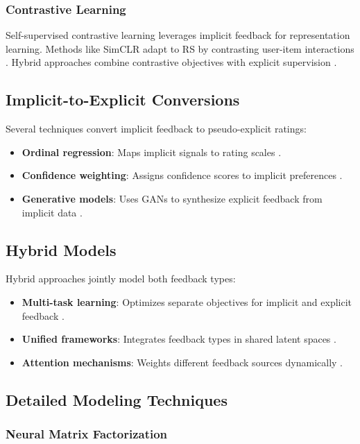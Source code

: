 \subsubsection{Contrastive Learning}
Self-supervised contrastive learning leverages implicit feedback for representation learning. Methods like SimCLR adapt to RS by contrasting user-item interactions \cite{wu2021self}. Hybrid approaches combine contrastive objectives with explicit supervision \cite{xie2022contrastive}.

\subsection{Implicit-to-Explicit Conversions}

Several techniques convert implicit feedback to pseudo-explicit ratings:
\begin{itemize}
    \item \textbf{Ordinal regression}: Maps implicit signals to rating scales \cite{weston2011wsabie}.
    \item \textbf{Confidence weighting}: Assigns confidence scores to implicit preferences \cite{he2016fast}.
    \item \textbf{Generative models}: Uses GANs to synthesize explicit feedback from implicit data \cite{wang2017irgan}.
\end{itemize}

\subsection{Hybrid Models}

Hybrid approaches jointly model both feedback types:
\begin{itemize}
    \item \textbf{Multi-task learning}: Optimizes separate objectives for implicit and explicit feedback \cite{ma2011learning}.
    \item \textbf{Unified frameworks}: Integrates feedback types in shared latent spaces \cite{lian2017cccfnet}.
    \item \textbf{Attention mechanisms}: Weights different feedback sources dynamically \cite{chen2017attentive}.
\end{itemize}

\subsection{Detailed Modeling Techniques}

\subsubsection{Neural Matrix Factorization}

